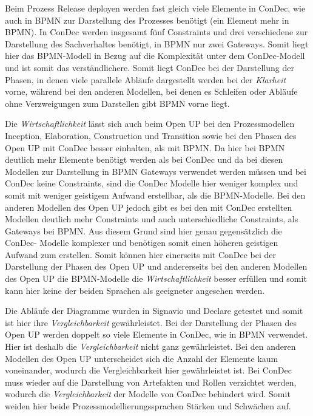 Beim Prozess Release deployen werden fast gleich viele Elemente in ConDec, wie auch in BPMN zur Darstellung des Prozesses benötigt (ein Element mehr in BPMN). In ConDec werden insgesamt fünf Constraints und drei verschiedene zur Darstellung des Sachverhaltes benötigt, in BPMN nur zwei Gateways. Somit liegt hier das BPMN-Modell in Bezug auf die Komplexität unter dem ConDec-Modell und ist somit das verständlichere.\newline
Somit liegt ConDec bei der Darstellung der Phasen, in denen viele parallele Abläufe dargestellt werden bei der \textit{Klarheit} vorne, während bei den anderen Modellen, bei denen es Schleifen oder Abläufe ohne Verzweigungen zum Darstellen gibt BPMN vorne liegt.\newline

Die \textit{Wirtschaftlichkeit} lässt sich auch beim Open UP bei den Prozessmodellen Inception, Elaboration, Construction und Transition sowie bei den Phasen des Open UP mit ConDec besser einhalten, als mit BPMN. Da hier bei BPMN deutlich mehr Elemente benötigt werden als bei ConDec und da bei diesen Modellen zur Darstellung in BPMN Gateways verwendet werden müssen und bei ConDec keine Constraints, sind die ConDec Modelle hier weniger komplex und somit mit weniger geistigem Aufwand erstellbar, als die BPMN-Modelle.  \newline
Bei den anderen Modellen des Open UP jedoch gibt es bei den mit ConDec erstellten Modellen deutlich mehr Constraints und auch unterschiedliche Constraints, als  Gateways bei BPMN. Aus diesem Grund sind hier genau gegensätzlich die ConDec- Modelle komplexer und benötigen somit einen höheren geistigen Aufwand zum erstellen. \newline
Somit können hier einerseits mit ConDec bei der Darstellung der Phasen des Open UP und andererseits bei den anderen Modellen des Open UP die BPMN-Modelle die \textit{Wirtschaftlichkeit} besser erfüllen und somit kann hier keine der beiden Sprachen als geeigneter angesehen werden.\newline


Die Abläufe der Diagramme wurden in Signavio und Declare getestet und somit ist hier ihre \textit{Vergleichbarkeit} gewährleistet.\newline
Bei der Darstellung der Phasen des Open UP werden doppelt so viele Elemente in ConDec, wie in BPMN verwendet. Hier ist deshalb die \textit{Vergleichbarkeit} nicht ganz gewährleistet. Bei den anderen Modellen des Open UP unterscheidet sich die Anzahl der Elemente kaum voneinander, wodurch die Vergleichbarkeit hier gewährleistet ist. \newline
Bei ConDec muss wieder auf die Darstellung von Artefakten und Rollen verzichtet werden, wodurch die \textit{Vergleichbarkeit} der Modelle von ConDec behindert wird. Somit weiden hier beide Prozessmodellierungssprachen Stärken und Schwächen auf.\newline

